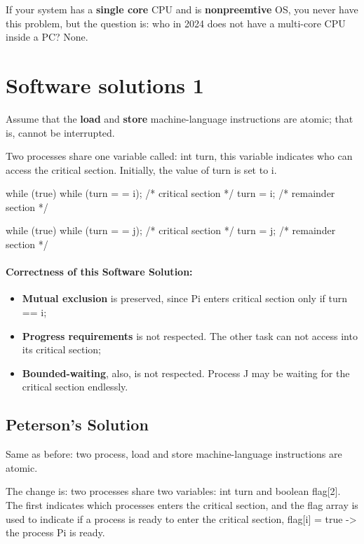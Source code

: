If your system has a \textbf{single core} CPU and is \textbf{nonpreemtive} OS, you never have this problem, but the question is: who in 2024 does not have a multi-core CPU inside a PC? None.
\newpage
\section{Software solutions 1}
Assume that the \textbf{load} and \textbf{store} machine-language instructions are atomic; that is, cannot be interrupted. 

Two processes share one variable called: int turn, this variable indicates who can access the critical section. Initially, the value of turn is set to i.

\begin{codeInC}
while (true){
    while (turn = = i);
    /* critical section */
    turn = i;
    /* remainder section */
}
\end{codeInC}


\begin{codeInC}
while (true){
    while (turn = = j);
    /* critical section */
    turn = j;
    /* remainder section */
}
\end{codeInC}

\paragraph{Correctness of this Software Solution:} 

\begin{itemize}
    \item \textbf{Mutual exclusion} is preserved, since Pi enters critical section only if turn == i;
    \item \textbf{Progress requirements} is not respected. The other task can not access into its critical section;
    \item \textbf{Bounded-waiting}, also, is not respected. Process J may be waiting for the critical section endlessly.
\end{itemize}


\subsection{Peterson’s Solution}

Same as before: two process, load and store machine-language instructions are atomic.

The change is: two processes share two variables: int turn and boolean flag[2]. The first indicates which processes enters the critical section, and the flag array is used to indicate if a process is ready to enter the critical section, flag[i] = true -> the process Pi is ready.

